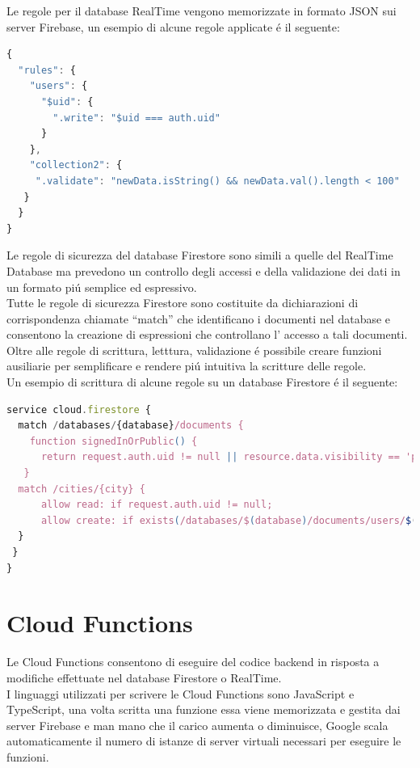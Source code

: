 Le regole per il database RealTime vengono memorizzate in formato JSON sui server Firebase, un esempio di alcune regole applicate \'e il seguente:


\begin{lstlisting}[language=javascript,caption={Firebase Rules esempio }]
{
  "rules": {
    "users": {
      "$uid": {
        ".write": "$uid === auth.uid"
      }
    },
    "collection2": {
     ".validate": "newData.isString() && newData.val().length < 100"
   }
  }
}
\end{lstlisting}




Le regole di sicurezza del database Firestore sono simili a quelle del RealTime Database ma prevedono un controllo degli accessi e della validazione dei dati in un formato pi\'u semplice ed espressivo.\\
Tutte le regole di sicurezza Firestore sono costituite da dichiarazioni di corrispondenza chiamate ``match'' che identificano i documenti nel database e consentono la creazione di espressioni che controllano l' accesso a tali documenti.\\
Oltre alle regole di scrittura, letttura, validazione \'e possibile creare funzioni ausiliarie per semplificare e rendere pi\'u intuitiva la scritture delle regole.\\
Un esempio di scrittura di alcune regole su un database Firestore \'e il seguente:

\begin{lstlisting}[language=javascript,caption={Firestore Rules}]
service cloud.firestore {
  match /databases/{database}/documents {
    function signedInOrPublic() {
      return request.auth.uid != null || resource.data.visibility == 'public';
   }
  match /cities/{city} {
      allow read: if request.auth.uid != null;
      allow create: if exists(/databases/$(database)/documents/users/$(request.auth.uid))
  }
 }
}
\end{lstlisting}



\section{Cloud Functions}                 %

Le Cloud Functions consentono di eseguire del codice backend in risposta a modifiche effettuate nel database Firestore o RealTime.\\
I linguaggi utilizzati per scrivere le Cloud Functions sono JavaScript e TypeScript, una volta scritta una funzione essa viene memorizzata e gestita dai server Firebase e man mano che il carico aumenta o diminuisce, Google scala automaticamente il numero di istanze di server virtuali necessari per eseguire le funzioni.


